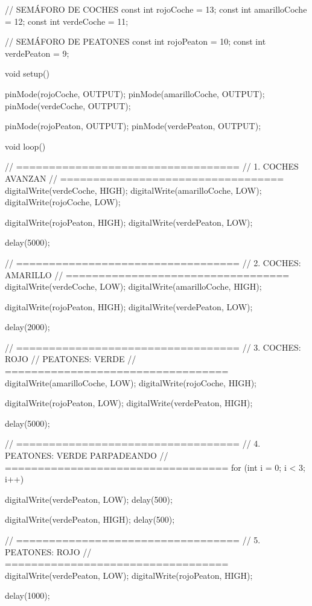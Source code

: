 // SEMÁFORO DE COCHES
const int rojoCoche = 13;
const int amarilloCoche = 12;
const int verdeCoche = 11;

// SEMÁFORO DE PEATONES
const int rojoPeaton = 10;
const int verdePeaton = 9;

void setup() {
  pinMode(rojoCoche, OUTPUT);
  pinMode(amarilloCoche, OUTPUT);
  pinMode(verdeCoche, OUTPUT);

  pinMode(rojoPeaton, OUTPUT);
  pinMode(verdePeaton, OUTPUT);
}

void loop() {

  // ==================================
  // 1. COCHES AVANZAN
  // ==================================
  digitalWrite(verdeCoche, HIGH);
  digitalWrite(amarilloCoche, LOW);
  digitalWrite(rojoCoche, LOW);

  digitalWrite(rojoPeaton, HIGH);
  digitalWrite(verdePeaton, LOW);

  delay(5000);


  // ==================================
  // 2. COCHES: AMARILLO
  // ==================================
  digitalWrite(verdeCoche, LOW);
  digitalWrite(amarilloCoche, HIGH);

  digitalWrite(rojoPeaton, HIGH);
  digitalWrite(verdePeaton, LOW);

  delay(2000);


  // ==================================
  // 3. COCHES: ROJO
  //    PEATONES: VERDE
  // ==================================
  digitalWrite(amarilloCoche, LOW);
  digitalWrite(rojoCoche, HIGH);

  digitalWrite(rojoPeaton, LOW);
  digitalWrite(verdePeaton, HIGH);

  delay(5000);


  // ==================================
  // 4. PEATONES: VERDE PARPADEANDO
  // ==================================
  for (int i = 0; i < 3; i++) {
    digitalWrite(verdePeaton, LOW);
    delay(500);

    digitalWrite(verdePeaton, HIGH);
    delay(500);
  }


  // ==================================
  // 5. PEATONES: ROJO
  // ==================================
  digitalWrite(verdePeaton, LOW);
  digitalWrite(rojoPeaton, HIGH);

  delay(1000);
}
